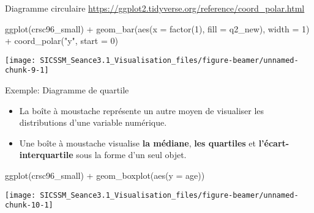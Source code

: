 \documentclass[
  ignorenonframetext,
]{beamer}
\newenvironment{Shaded}{\begin{snugshade}}{\end{snugshade}}
\newcommand{\AttributeTok}[1]{\textcolor[rgb]{0.77,0.63,0.00}{#1}}
\newcommand{\DecValTok}[1]{\textcolor[rgb]{0.00,0.00,0.81}{#1}}
\newcommand{\FunctionTok}[1]{\textcolor[rgb]{0.00,0.00,0.00}{#1}}
\newcommand{\NormalTok}[1]{#1}
\newcommand{\SpecialCharTok}[1]{\textcolor[rgb]{0.00,0.00,0.00}{#1}}
\newcommand{\StringTok}[1]{\textcolor[rgb]{0.31,0.60,0.02}{#1}}
\providecommand{\tightlist}{%
  \setlength{\itemsep}{0pt}\setlength{\parskip}{0pt}}
\begin{document}
\begin{frame}[fragile]{Diagramme circulaire}
\protect\hypertarget{diagramme-circulaire}{}
\url{https://ggplot2.tidyverse.org/reference/coord_polar.html}

\begin{Shaded}
\begin{Highlighting}[]
\FunctionTok{ggplot}\NormalTok{(crsc96\_small) }\SpecialCharTok{+}
  \FunctionTok{geom\_bar}\NormalTok{(}\FunctionTok{aes}\NormalTok{(}\AttributeTok{x =} \FunctionTok{factor}\NormalTok{(}\DecValTok{1}\NormalTok{), }\AttributeTok{fill =}\NormalTok{ q2\_new), }\AttributeTok{width =} \DecValTok{1}\NormalTok{) }\SpecialCharTok{+} 
  \FunctionTok{coord\_polar}\NormalTok{(}\StringTok{"y"}\NormalTok{, }\AttributeTok{start =} \DecValTok{0}\NormalTok{) }
\end{Highlighting}
\end{Shaded}

\begin{center}\texttt{[image: SICSSM\_Seance3.1\_Visualisation\_files/figure-beamer/unnamed-chunk-9-1]} \end{center}
\end{frame}

\begin{frame}[fragile]{Exemple: Diagramme de quartile}
\protect\hypertarget{exemple-diagramme-de-quartile}{}
\begin{itemize}
\tightlist
\item
  La boîte à moustache représente un autre moyen de visualiser les
  distributions d'une variable numérique.
\item
  Une boîte à moustache visualise \textbf{la médiane}, \textbf{les
  quartiles} et \textbf{l'écart-interquartile} sous la forme d'un seul
  objet.
\end{itemize}

\begin{Shaded}
\begin{Highlighting}[]
\FunctionTok{ggplot}\NormalTok{(crsc96\_small) }\SpecialCharTok{+} 
  \FunctionTok{geom\_boxplot}\NormalTok{(}\FunctionTok{aes}\NormalTok{(}\AttributeTok{y =}\NormalTok{ age))}
\end{Highlighting}
\end{Shaded}

\begin{center}\texttt{[image: SICSSM\_Seance3.1\_Visualisation\_files/figure-beamer/unnamed-chunk-10-1]} \end{center}
\end{frame}
\end{document}
